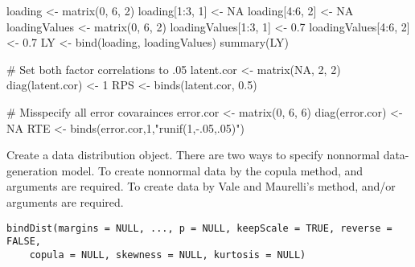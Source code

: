 \documentclass[a4paper]{book}
\begin{document}
%
\begin{Examples}
\begin{ExampleCode}
loading <- matrix(0, 6, 2)
loading[1:3, 1] <- NA
loading[4:6, 2] <- NA
loadingValues <- matrix(0, 6, 2)
loadingValues[1:3, 1] <- 0.7
loadingValues[4:6, 2] <- 0.7
LY <- bind(loading, loadingValues)
summary(LY)

# Set both factor correlations to .05
latent.cor <- matrix(NA, 2, 2)
diag(latent.cor) <- 1
RPS <- binds(latent.cor, 0.5)

# Misspecify all error covarainces
error.cor <- matrix(0, 6, 6)
diag(error.cor) <- NA
RTE <- binds(error.cor,1,"runif(1,-.05,.05)")
\end{ExampleCode}
\end{Examples}
%
\begin{Description}\relax
Create a data distribution object. There are two ways to specify nonnormal data-generation model. To create nonnormal data by the copula method,  and  arguments are required. To create data by Vale and Maurelli's method,  and/or  arguments are required.
\end{Description}
%
\begin{Usage}
\begin{verbatim}
bindDist(margins = NULL, ..., p = NULL, keepScale = TRUE, reverse = FALSE, 
	copula = NULL, skewness = NULL, kurtosis = NULL)
\end{verbatim}
\end{Usage}
%
\end{document}
